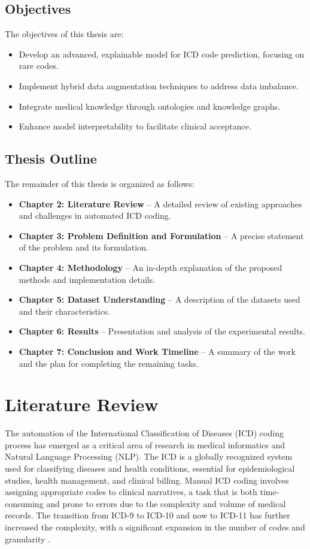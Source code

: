\documentclass[12pt,a4paper]{report}
\begin{document}
\section{Objectives}
The objectives of this thesis are:
\begin{itemize}
    \item Develop an advanced, explainable model for ICD code prediction, focusing on rare codes.
    \item Implement hybrid data augmentation techniques to address data imbalance.
    \item Integrate medical knowledge through ontologies and knowledge graphs.
    \item Enhance model interpretability to facilitate clinical acceptance.
\end{itemize}

\section{Thesis Outline}
The remainder of this thesis is organized as follows:
\begin{itemize}
    \item \textbf{Chapter 2: Literature Review} – A detailed review of existing approaches and challenges in automated ICD coding.
    \item \textbf{Chapter 3: Problem Definition and Formulation} – A precise statement of the problem and its formulation.
    \item \textbf{Chapter 4: Methodology} – An in-depth explanation of the proposed methods and implementation details.
    \item \textbf{Chapter 5: Dataset Understanding} – A description of the datasets used and their characteristics.
    \item \textbf{Chapter 6: Results} – Presentation and analysis of the experimental results.
    \item \textbf{Chapter 7: Conclusion and Work Timeline} – A summary of the work and the plan for completing the remaining tasks.
\end{itemize}

\chapter{Literature Review}

The automation of the International Classification of Diseases (ICD) coding process has emerged as a critical area of research in medical informatics and Natural Language Processing (NLP). The ICD is a globally recognized system used for classifying diseases and health conditions, essential for epidemiological studies, health management, and clinical billing. Manual ICD coding involves assigning appropriate codes to clinical narratives, a task that is both time-consuming and prone to errors due to the complexity and volume of medical records. The transition from ICD-9 to ICD-10 and now to ICD-11 has further increased the complexity, with a significant expansion in the number of codes and granularity \cite{who2019icd11}.
\end{document}
